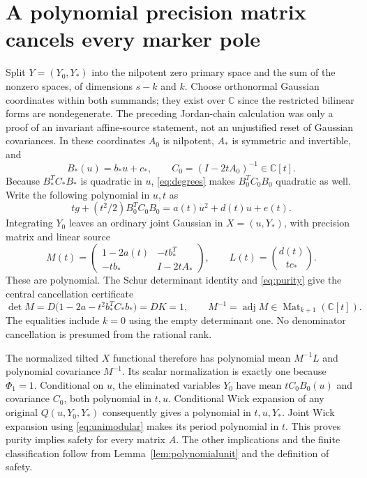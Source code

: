 \documentclass[11pt]{article}
\theoremstyle{definition}\newtheorem{definition}[theorem]{Definition}
\theoremstyle{remark}\newtheorem{remark}[theorem]{Remark}
\newcommand{\C}{\mathbb C}
\begin{document}
\section{A polynomial precision matrix cancels every marker pole}

Split $Y=(Y_0,Y_*)$ into the nilpotent zero primary space and
the sum of the nonzero spaces, of dimensions $s-k$ and $k$.
Choose orthonormal Gaussian coordinates within both summands;
they exist over $\C$ since the restricted bilinear forms are
nondegenerate. The preceding Jordan-chain calculation was only
a proof of an invariant affine-source statement, not an
unjustified reset of Gaussian covariances. In these coordinates
$A_0$ is nilpotent, $A_*$ is symmetric and invertible, and
\[
 B_*(u)=b_*u+c_*,\qquad C_0=(I-2tA_0)^{-1}\in\C[t].
\]
Because $B_*^TC_*B_*$ is quadratic in $u$,
\eqref{eq:degrees} makes $B_0^TC_0B_0$ quadratic as well.
Write the following polynomial in $u,t$ as
\[
 tg+(t^2/2)B_0^TC_0B_0=a(t)u^2+d(t)u+e(t).
\]
Integrating $Y_0$ leaves an ordinary joint Gaussian in
$X=(u,Y_*)$, with precision matrix and linear source
\begin{equation}\label{eq:precision}
 M(t)=\begin{pmatrix}
  1-2a(t)&-t b_*^T\\-t b_*&I-2tA_*
 \end{pmatrix},\qquad
 L(t)=\binom{d(t)}{t c_*}.
\end{equation}
These are polynomial. The Schur determinant identity and
\eqref{eq:purity} give the central cancellation certificate
\begin{equation}\label{eq:unimodular}
 \det M=D\bigl(1-2a-t^2b_*^TC_*b_*\bigr)=DK=1,
 \qquad M^{-1}=\operatorname{adj}M\in\operatorname{Mat}_{k+1}(\C[t]).
\end{equation}
The equalities include $k=0$ using the empty determinant one.
No denominator cancellation is presumed from the rational rank.

The normalized tilted $X$ functional therefore has polynomial
mean $M^{-1}L$ and polynomial covariance $M^{-1}$. Its scalar
normalization is exactly one because $\Phi_1=1$. Conditional
on $u$, the eliminated variables $Y_0$ have mean $tC_0B_0(u)$
and covariance $C_0$, both polynomial in $t,u$. Conditional
Wick expansion of any original $Q(u,Y_0,Y_*)$ consequently
gives a polynomial in $t,u,Y_*$. Joint Wick expansion using
\eqref{eq:unimodular} makes its period polynomial in $t$.
This proves purity implies safety for every matrix $A$.
The other implications and the finite classification follow
from Lemma~\ref{lem:polynomialunit} and the definition of safety.
\end{document}

